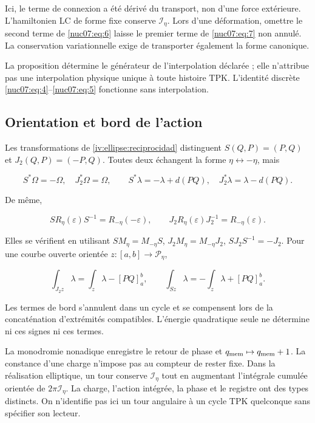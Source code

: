 Ici, le terme de connexion a été dérivé du transport, non d’une force extérieure. L’hamiltonien LC de forme fixe conserve \(\mathcal I_\eta\). Lors d’une déformation, omettre le second terme de \eqref{nuc07:eq:6} laisse le premier terme de \eqref{nuc07:eq:7} non annulé. La conservation variationnelle exige de transporter également la forme canonique.


La proposition détermine le générateur de l’interpolation déclarée ; elle n’attribue pas une interpolation physique unique à toute histoire TPK. L’identité discrète \eqref{nuc07:eq:4}–\eqref{nuc07:eq:5} fonctionne sans interpolation.

\subsection{Orientation et bord de l’action}

Les transformations de \cref{iv:ellipse:reciprocidad} distinguent \(S(Q,P)=(P,Q)\) et \(J_2(Q,P)=(-P,Q)\). Toutes deux échangent la forme \(\eta\leftrightarrow-\eta\), mais

\begin{equation}
S^*\Omega=-\Omega,\quad J_2^*\Omega=\Omega,\qquad
S^*\lambda=-\lambda+d(PQ),\quad
J_2^*\lambda=\lambda-d(PQ).
\label{nuc07:eq:9}
\end{equation}

De même,

\begin{equation}
S R_\eta(\varepsilon)S^{-1}=R_{-\eta}(-\varepsilon),\qquad
J_2R_\eta(\varepsilon)J_2^{-1}=R_{-\eta}(\varepsilon).
\label{nuc07:eq:10}
\end{equation}

Elles se vérifient en utilisant \(SM_\eta=M_{-\eta}S\), \(J_2M_\eta=M_{-\eta}J_2\), \(SJ_2S^{-1}=-J_2\). Pour une courbe ouverte orientée \(z:[a,b]\to\mathcal P_\eta\),

\begin{equation}
\int_{J_2z}\lambda=\int_z\lambda-[PQ]_a^b,\qquad
\int_{Sz}\lambda=-\int_z\lambda+[PQ]_a^b.
\label{nuc07:eq:11}
\end{equation}

Les termes de bord s’annulent dans un cycle et se compensent lors de la concaténation d’extrémités compatibles. L’énergie quadratique seule ne détermine ni ces signes ni ces termes.

La monodromie nonadique enregistre le retour de phase et \(q_{\rm mem}\mapsto q_{\rm mem}+1\). La constance d’une charge n’impose pas au compteur de rester fixe. Dans la réalisation elliptique, un tour conserve \(\mathcal I_\eta\) tout en augmentant l’intégrale cumulée orientée de \(2\pi\mathcal I_\eta\). La charge, l’action intégrée, la phase et le registre ont des types distincts. On n’identifie pas ici un tour angulaire à un cycle TPK quelconque sans spécifier son lecteur.

